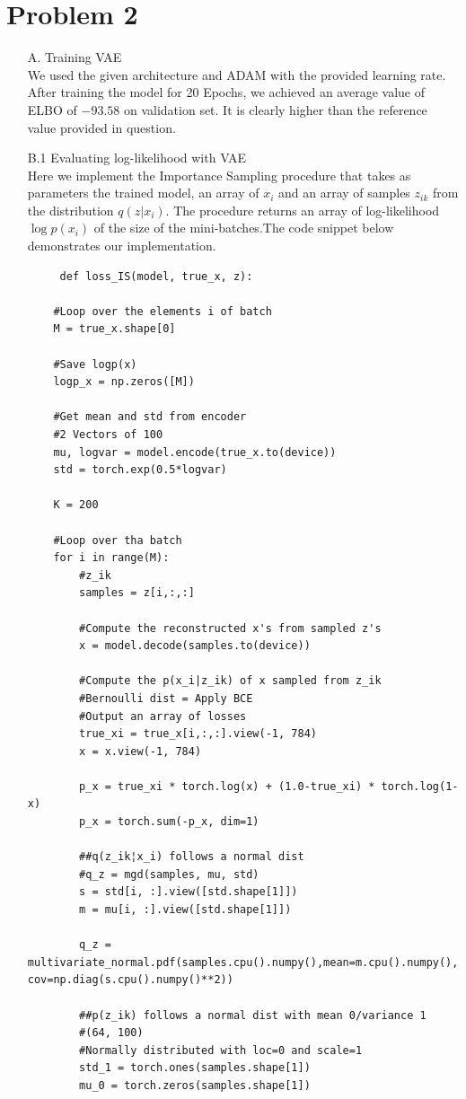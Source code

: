 \section*{Problem 2}
\begin{itemize}
     \item[A.]{Training VAE}\\
     We used the given architecture and ADAM with the provided learning rate. After training the model for 20 Epochs, we achieved an average value of ELBO of $-93.58$ on validation set. It is clearly higher than the reference value provided in question.  
     
     \item[B.1]{Evaluating log-likelihood with VAE}\\
     Here we implement the Importance Sampling procedure that takes as parameters the trained model, an array of $x_i$ and an array of samples $z_{ik}$ from the distribution $q(z|x_i)$. The procedure returns an array of log-likelihood $\log p(x_i)$  of the size of the mini-batches.The code snippet below demonstrates our implementation. 
     \begin{lstlisting}
     def loss_IS(model, true_x, z):

	#Loop over the elements i of batch
	M = true_x.shape[0]

	#Save logp(x)
	logp_x = np.zeros([M])

	#Get mean and std from encoder
	#2 Vectors of 100
	mu, logvar = model.encode(true_x.to(device))
	std = torch.exp(0.5*logvar)

	K = 200

	#Loop over tha batch
	for i in range(M):
		#z_ik
		samples = z[i,:,:]

		#Compute the reconstructed x's from sampled z's
		x = model.decode(samples.to(device))	

		#Compute the p(x_i|z_ik) of x sampled from z_ik
		#Bernoulli dist = Apply BCE
		#Output an array of losses
		true_xi = true_x[i,:,:].view(-1, 784)
		x = x.view(-1, 784)
	
		p_x = true_xi * torch.log(x) + (1.0-true_xi) * torch.log(1-x)
		p_x = torch.sum(-p_x, dim=1)
		
		##q(z_ik¦x_i) follows a normal dist
		#q_z = mgd(samples, mu, std)
		s = std[i, :].view([std.shape[1]])
		m = mu[i, :].view([std.shape[1]])
		
		q_z = multivariate_normal.pdf(samples.cpu().numpy(),mean=m.cpu().numpy(), cov=np.diag(s.cpu().numpy()**2))

		##p(z_ik) follows a normal dist with mean 0/variance 1
		#(64, 100)	
		#Normally distributed with loc=0 and scale=1
		std_1 = torch.ones(samples.shape[1])
		mu_0 = torch.zeros(samples.shape[1])		


\end{lstlisting}
\end{itemize}
